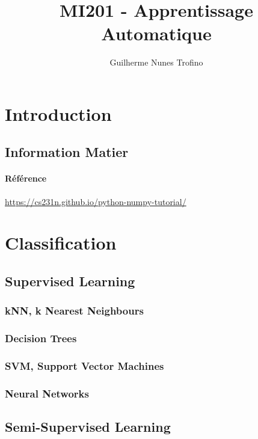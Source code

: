 \documentclass{article}
\title{MI201 - Apprentissage Automatique}
\author{Guilherme Nunes Trofino}
\begin{document}
\maketitle
\setlength{\parindent}{0pt}


\newpage\tableofcontents

\section{Introduction}

% 
% 


\subsection{Information Matier}
\paragraph{Référence}
\url{https://cs231n.github.io/python-numpy-tutorial/}


\section{Classification}

\subsection{Supervised Learning}
\subsubsection{kNN, k Nearest Neighbours}
\subsubsection{Decision Trees}
\subsubsection{SVM, Support Vector Machines}
\subsubsection{Neural Networks}

\subsection{Semi-Supervised Learning}
\end{document}
